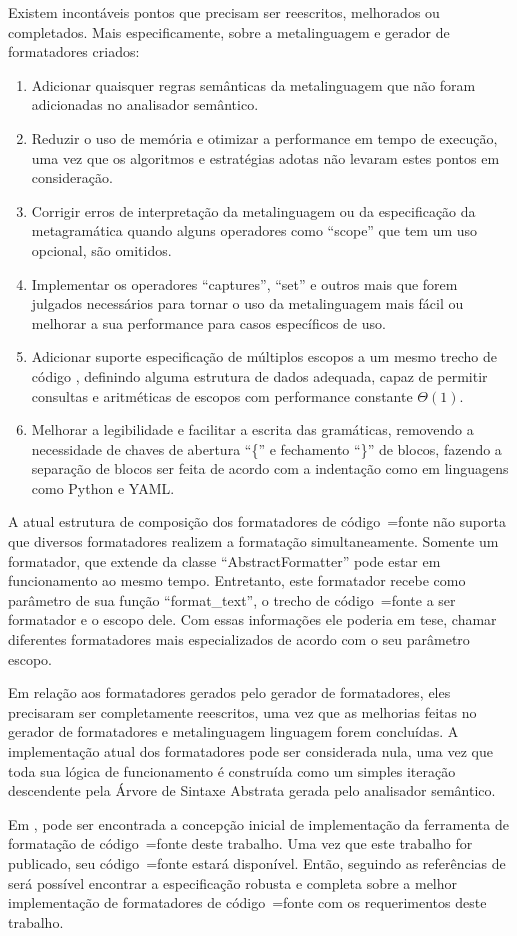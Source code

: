 Existem incontáveis pontos que precisam ser reescritos,
melhorados ou completados. Mais especificamente,
sobre a metalinguagem e
gerador de formatadores criados:
\begin{enumerate}
\item Adicionar quaisquer regras semânticas da metalinguagem que não foram adicionadas no analisador semântico.
\item Reduzir o uso de memória e
otimizar a performance em tempo de execução,
uma vez que os algoritmos e
estratégias adotas não levaram estes pontos em consideração.
\item Corrigir erros de interpretação da metalinguagem ou
da especificação da metagramática quando alguns operadores como ``scope'' que tem um uso opcional,
são omitidos.
\item Implementar os operadores ``captures'',
``set'' e
outros mais que forem julgados necessários para tornar o uso da metalinguagem mais fácil ou
melhorar a sua performance para casos específicos de uso.
\item Adicionar suporte especificação de múltiplos escopos a um mesmo trecho de código \cite{vsCodeSyntaxHighlighthing},
definindo alguma estrutura de dados adequada,
capaz de permitir consultas e
aritméticas de escopos \cite{textMateScopeExclusion} com performance constante $\Theta(1)$.
\item Melhorar a legibilidade e
facilitar a escrita das gramáticas,
removendo a necessidade de chaves de abertura ``\{'' e
fechamento ``\}'' de blocos,
fazendo a separação de blocos ser feita de acordo com a indentação como em linguagens como Python e
YAML.
\end{enumerate}%

A atual estrutura de composição dos formatadores de código~=fonte não suporta que diversos formatadores realizem a formatação simultaneamente.
Somente um formatador,
que extende da classe ``AbstractFormatter'' pode estar em funcionamento ao mesmo tempo.
Entretanto,
este formatador recebe como parâmetro de sua função ``format\_text'',
o trecho de código~=fonte a ser formatador e
o escopo dele.
Com essas informações ele poderia em tese,
chamar diferentes formatadores mais especializados de acordo com o seu parâmetro escopo.

Em relação aos formatadores gerados pelo gerador de formatadores,
eles precisaram ser completamente reescritos,
uma vez que as melhorias feitas no gerador de formatadores e
metalinguagem linguagem forem concluídas.
A implementação atual dos formatadores pode ser considerada nula,
uma vez que toda sua lógica de funcionamento é construída como um simples iteração descendente pela Árvore de Sintaxe Abstrata gerada pelo analisador semântico.

Em ,
pode ser encontrada a concepção inicial de implementação da ferramenta de formatação de código~=fonte deste trabalho.
Uma vez que este trabalho for publicado,
seu código~=fonte estará disponível.
Então,
seguindo as referências de  será possível encontrar a especificação robusta e
completa sobre a melhor implementação de formatadores de código~=fonte com os requerimentos deste trabalho.

